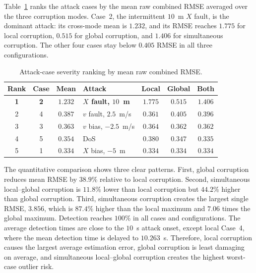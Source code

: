 \documentclass[letterpaper,journal]{IEEEtran}
\begin{document}
Table~\ref{tab:case_ranking} ranks the attack cases by the mean raw combined RMSE averaged over the three corruption modes. Case~2, the intermittent $10$~m $X$ fault, is the dominant attack: its cross-mode mean is $1.232$, and its RMSE reaches $1.775$ for local corruption, $0.515$ for global corruption, and $1.406$ for simultaneous corruption. The other four cases stay below $0.405$ RMSE in all three configurations.

\begin{table}[!t]
\centering
\caption{Attack-case severity ranking by mean raw combined RMSE.}
\label{tab:case_ranking}
\scriptsize
\setlength{\tabcolsep}{0pt}
\renewcommand{\arraystretch}{1.18}
\begin{tabular*}{\columnwidth}{@{\extracolsep{\fill}}ccclccc@{}}
\toprule
\textbf{Rank} & \textbf{Case} & \textbf{Mean} & \textbf{Attack} & \textbf{Local} & \textbf{Global} & \textbf{Both} \\
\midrule
\textbf{1} & \textbf{2} & $\mathbf{1.232}$ & \textbf{$X$ fault, $10$~m} & $\mathbf{1.775}$ & $\mathbf{0.515}$ & $\mathbf{1.406}$ \\
2 & 4 & $0.387$ & $v$ fault, $2.5$~m/s & $0.361$ & $0.405$ & $0.396$ \\
3 & 3 & $0.363$ & $v$ bias, $-2.5$~m/s & $0.364$ & $0.362$ & $0.362$ \\
4 & 5 & $0.354$ & DoS & $0.380$ & $0.347$ & $0.335$ \\
5 & 1 & $0.334$ & $X$ bias, $-5$~m & $0.334$ & $0.334$ & $0.334$ \\
\bottomrule
\end{tabular*}
\end{table}

The quantitative comparison shows three clear patterns. First, global corruption reduces mean RMSE by $38.9\%$ relative to local corruption. Second, simultaneous local--global corruption is $11.8\%$ lower than local corruption but $44.2\%$ higher than global corruption. Third, simultaneous corruption creates the largest single RMSE, $3.856$, which is $87.4\%$ higher than the local maximum and $7.06$ times the global maximum. Detection reaches $100\%$ in all cases and configurations. The average detection times are close to the $10$~s attack onset, except local Case~4, where the mean detection time is delayed to $10.263$~s. Therefore, local corruption causes the largest average estimation error, global corruption is least damaging on average, and simultaneous local--global corruption creates the highest worst-case outlier risk.
\end{document}
